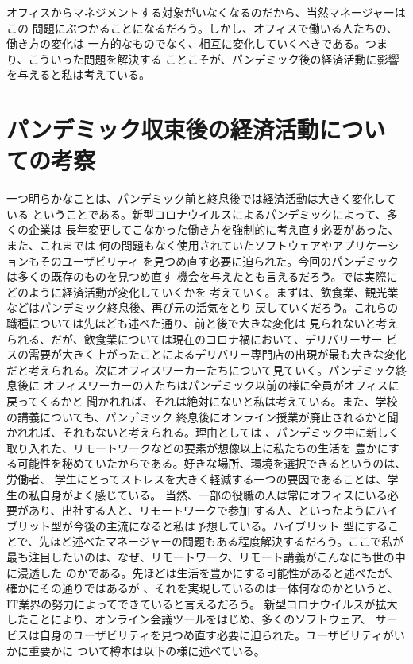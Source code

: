 \documentclass[dvipdfmx,autodetect-engine,titlepage]{jsarticle}
\begin{document}
オフィスからマネジメントする対象がいなくなるのだから、当然マネージャーはこの
問題にぶつかることになるだろう。しかし、オフィスで働いる人たちの、働き方の変化は
一方的なものでなく、相互に変化していくべきである。つまり、こういった問題を解決する
ことこそが、パンデミック後の経済活動に影響を与えると私は考えている。

\section{パンデミック収束後の経済活動についての考察}
一つ明らかなことは、パンデミック前と終息後では経済活動は大きく変化している
ということである。新型コロナウイルスによるパンデミックによって、多くの企業は
長年変更してこなかった働き方を強制的に考え直す必要があった、また、これまでは
何の問題もなく使用されていたソフトウェアやアプリケーションもそのユーザビリティ
を見つめ直す必要に迫られた。今回のパンデミックは多くの既存のものを見つめ直す
機会を与えたとも言えるだろう。では実際にどのように経済活動が変化していくかを
考えていく。まずは、飲食業、観光業などはパンデミック終息後、再び元の活気をとり
戻していくだろう。これらの職種については先ほども述べた通り、前と後で大きな変化は
見られないと考えられる、だが、飲食業については現在のコロナ禍において、デリバリーサー
ビスの需要が大きく上がったことによるデリバリー専門店の出現が最も大きな変化
だと考えられる。次にオフィスワーカーたちについて見ていく。パンデミック終息後に
オフィスワーカーの人たちはパンデミック以前の様に全員がオフィスに戻ってくるかと
聞かれれば、それは絶対にないと私は考えている。また、学校の講義についても、パンデミック
終息後にオンライン授業が廃止されるかと聞かれれば、それもないと考えられる。理由としては
、パンデミック中に新しく取り入れた、リモートワークなどの要素が想像以上に私たちの生活を
豊かにする可能性を秘めていたからである。好きな場所、環境を選択できるというのは、労働者、
学生にとってストレスを大きく軽減する一つの要因であることは、学生の私自身がよく感じている。
当然、一部の役職の人は常にオフィスにいる必要があり、出社する人と、リモートワークで参加
する人、といったようにハイブリット型が今後の主流になると私は予想している。ハイブリット
型にすることで、先ほど述べたマネージャーの問題もある程度解決するだろう。ここで私が
最も注目したいのは、なぜ、リモートワーク、リモート講義がこんなにも世の中に浸透した
のかである。先ほどは生活を豊かにする可能性があると述べたが、確かにその通りではあるが
、それを実現しているのは一体何なのかというと、IT業界の努力によってできていると言えるだろう。
新型コロナウイルスが拡大したことにより、オンライン会議ツールをはじめ、多くのソフトウェア、
サービスは自身のユーザビリティを見つめ直す必要に迫られた。ユーザビリティがいかに重要かに
ついて樽本は以下の様に述べている。
\end{document}
